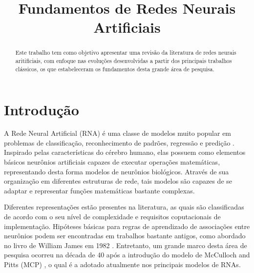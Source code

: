 \documentclass[conference]{IEEEtran}
\begin{document}
	
	\title{Fundamentos de Redes Neurais Artificiais}
	
	
	\author{
		}
	
	
	
	\maketitle
	
	\begin{abstract}
		Este trabalho tem como objetivo apresentar uma revisão da literatura de redes neurais aritificiais, com enfoque nas evoluções desenvolvidas a partir dos principais trabalhos clássicos, os que estabeleceram os fundamentos desta grande área de pesquisa. 
	\end{abstract}

	\section{Introdução}
	A Rede Neural Artificial (RNA) é uma classe de modelos muito popular em problemas de classificação, reconhecimento de padrões, regressão e predição \cite{jain1996artificial}. Inspirado pelas características do cérebro humano, elas possuem como elementos básicos neurônios artificiais capazes de executar operações matemáticas, representando desta forma modelos de neurônios biológicos. Através de sua organização em diferentes estruturas de rede, tais modelos são capazes de se adaptar e representar funções matemáticas bastante complexas. 
	
	Diferentes representações estão presentes na literatura, as quais são classificadas de acordo com o seu nível de complexidade e requisitos coputacionais de implementação. Hipóteses básicas para regras de aprendizado de associações entre neurônios podem ser encontradas em trabalhos bastante antigos, como abordado no livro de William James em 1982 \cite{james1984psychology}. Entretanto, um grande marco desta área de pesquisa ocorreu na década de 40 após a introdução do modelo de McCulloch and Pitts (MCP) \cite{mcculloch1943logical}, o qual é a adotado atualmente nos principais modelos de RNAs.
	
\end{document}

